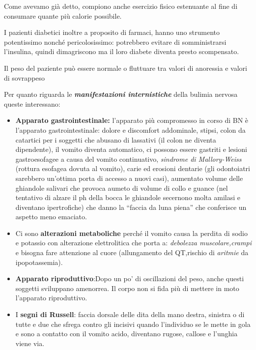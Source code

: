 \documentclass[]{article}
\begin{document}
Come avevamo già detto, compiono anche esercizio fisico estenuante al
fine di consumare quante più calorie possibile.

I pazienti diabetici inoltre a proposito di farmaci, hanno uno strumento
potentissimo nonché pericolosissimo: potrebbero evitare di
somministrarsi l'insulina, quindi dimagriscono ma il loro diabete
diventa presto scompensato.

Il peso del paziente può essere normale o fluttuare tra valori di
anoressia e valori di sovrappeso

Per quanto riguarda le \textbf{\emph{manifestazioni internistiche}}
della bulimia nervosa queste interessano:

\begin{itemize}
\item
  \textbf{Apparato gastrointestinale:} l'apparato più compromesso in
  corso di BN è l'apparato gastrointestinale: dolore e discomfort
  addominale, stipsi, colon da catartici per i soggetti che abusano di
  lassativi (il colon ne diventa dipendente), il vomito diventa
  automatico, ci possono essere gastriti e lesioni gastroesofagee a
  causa del vomito continuativo, \emph{sindrome di Mallory-Weiss}
  (rottura esofagea dovuta al vomito), carie ed erosioni dentarie (gli
  odontoiatri sarebbero un'ottima porta di accesso a nuovi casi),
  aumentato volume delle ghiandole salivari che provoca aumeto di volume
  di collo e guance (nel tentativo di alzare il ph della bocca le
  ghiandole secernono molta amilasi e diventano ipertrofiche) che danno
  la ``faccia da luna piena'' che conferisce un aspetto meno emaciato.
\end{itemize}

\begin{itemize}
\item
  Ci sono \textbf{alterazioni metaboliche} perché il vomito causa la
  perdita di sodio e potassio con alterazione elettrolitica che porta a:
  \emph{debolezza muscolare,crampi} e bisogna fare attenzione al cuore
  (allungamento del QT,rischio di \emph{aritmie} da ipopotassemia).
\item
  \textbf{Apparato riproduttivo}:Dopo un po' di oscillazioni del peso,
  anche questi soggetti sviluppano amenorrea. Il corpo non si fida più
  di mettere in moto l'apparato riproduttivo.
\item
  I \textbf{segni di Russell}: faccia dorsale delle dita della mano
  destra, sinistra o di tutte e due che sfrega contro gli incisivi
  quando l'individuo se le mette in gola e sono a contatto con il vomito
  acido, diventano rugose, callose e l'unghia viene via.
\end{itemize}
\end{document}
